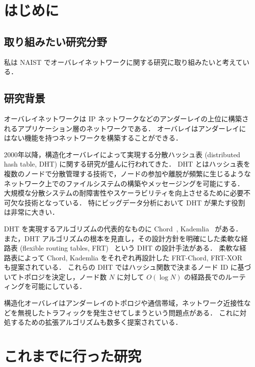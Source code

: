 \documentclass[10pt, a4paper, twocolumn]{jsarticle}
\begin{document}
%
%
\section{はじめに}
\subsection{取り組みたい研究分野}
私は NAIST でオーバレイネットワークに関する研究に取り組みたいと考えている．

\subsection{研究背景}
オーバレイネットワークは IP ネットワークなどのアンダーレイの上位に構築されるアプリケーション層のネットワークである．
オーバレイはアンダーレイにはない機能を持つネットワークを構築することができる．

2000年以降，構造化オーバレイによって実現する分散ハッシュ表 (distributed hash table, DHT) に関する研究が盛んに行われてきた．
DHT とはハッシュ表を複数のノードで分散管理する技術で，ノードの参加や離脱が頻繁に生じるようなネットワーク上でのファイルシステムの構築やメッセージングを可能にする．
大規模な分散システムの耐障害性やスケーラビリティを向上させるために必要不可欠な技術となっている．
特にビッグデータ分析において DHT が果たす役割は非常に大きい．

DHT を実現するアルゴリズムの代表的なものに Chord~\cite{Stoica2001}, Kademlia~\cite{Maymounkov2002} がある．
また，DHT アルゴリズムの根本を見直し，その設計方針を明確にした柔軟な経路表 (flexible routing tables, FRT)~\cite{Nagao2011} という DHT の設計手法がある．
柔軟な経路表によって Chord, Kademlia をそれぞれ再設計した FRT-Chord, FRT-XOR も提案されている．
これらの DHT ではハッシュ関数で決まるノード ID に基づいてトポロジを決定し，ノード数 $N$ に対して $O(\log N)$ の経路長でのルーティングを可能にしている．

構造化オーバレイはアンダーレイのトポロジや通信帯域，ネットワーク近接性などを無視したトラフィックを発生させてしまうという問題点がある．
これに対処するための拡張アルゴリズムも数多く提案されている．

\section{これまでに行った研究}
\end{document}
